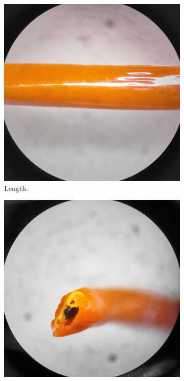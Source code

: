 \begin{figure}[h!]
        \centering
        \begin{subfigure}[b]{0.3\textwidth}
                \includegraphics[width=\textwidth]{./figures/filament-108-40-dip-side}
                \caption{Length.}
                \label{fig:filament-108-40-dip-side}
        \end{subfigure}
        \begin{subfigure}[b]{0.3\textwidth}
                \includegraphics[width=\textwidth]{./figures/filament-108-40-dip-end}

\end{subfigure}
\end{figure}
